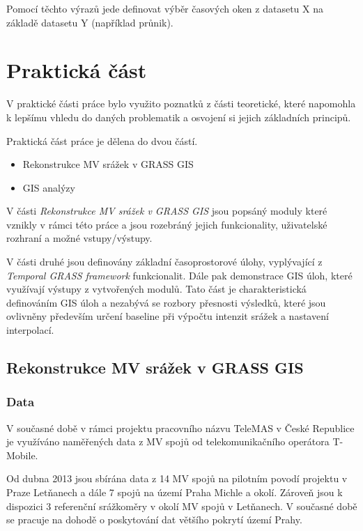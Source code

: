 \documentclass[a4paper,12pt,oneside]{report}
\begin{document}
Pomocí těchto výrazů jede definovat výběr časových oken z datasetu X na základě datasetu Y (například průnik).




\newpage
\chapter*{Praktická část}

V praktické části práce bylo využito poznatků z části teoretické, které napomohla k lepšímu vhledu do daných problematik a osvojení si jejich základních principů. 

Praktická část práce je dělena do dvou částí.

\begin{itemize}
\item Rekonstrukce MV srážek v GRASS GIS
\item GIS analýzy
\end{itemize}


V části \textit{Rekonstrukce MV srážek v GRASS GIS} jsou popsáný moduly které vznikly v rámci této práce a jsou rozebráný jejich funkcionality, uživatelské rozhraní a  možné vstupy/výstupy.

V části druhé jsou definovány základní časoprostorové úlohy, vyplývající z \textit{Temporal GRASS framework} funkcionalit. Dále pak demonstrace GIS úloh, které využívají výstupy z vytvořených modulů. Tato část je charakteristická definováním GIS úloh a nezabývá se rozbory přesnosti výsledků, které jsou ovlivněny především určení baseline při výpočtu intenzit srážek a nastavení interpolací.  

\section{Rekonstrukce MV srážek v GRASS GIS}

\subsection{Data}  
V současné době v rámci projektu pracovního názvu TeleMAS v České Republice je  využíváno naměřených data z MV spojů od telekomunikačního operátora T-Mobile. 

Od dubna 2013 jsou sbírána data z 14 MV spojů na pilotním povodí projektu v Praze Letňanech a dále 7 spojů na území Praha Michle a okolí. Zároveň jsou k dispozici 3 referenční srážkoměry v okolí MV spojů v Letňanech.
V současné době se pracuje na dohodě o poskytování dat většího pokrytí území Prahy.
\end{document}
